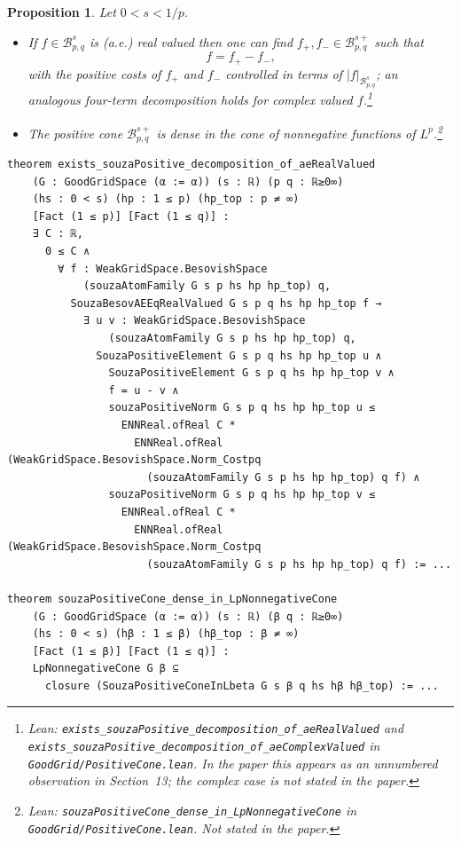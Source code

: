 \documentclass[11pt]{amsart}
\newtheorem{proposition}[theorem]{Proposition}
\theoremstyle{definition}
\newcommand{\lean}[1]{\texttt{#1}}
\begin{document}
\begin{proposition}\label{posdec}
Let $0 < s < 1/p$.
\begin{itemize}
\item[A.] If $f\in \mathcal{B}^s_{p,q}$ is (a.e.) real valued then one can
find $f_+,f_-\in \mathcal{B}^{s+}_{p,q}$ such that
$$f=f_+-f_-,$$
with the positive costs of $f_+$ and $f_-$ controlled in terms of
$|f|_{\mathcal{B}^{s}_{p,q}}$; an analogous four-term decomposition holds
for complex valued $f$.\footnote{Lean: \lean{exists\_souzaPositive\_decomposition\_of\_aeRealValued}
and \lean{exists\_souzaPositive\_decomposition\_of\_aeComplexValued} in
\lean{GoodGrid/PositiveCone.lean}. In the paper this appears as an unnumbered
observation in Section~13; the complex case is not stated in the paper.}
\item[B.] The positive cone $\mathcal{B}^{s+}_{p,q}$ is dense in the cone of
nonnegative functions of $L^p$.\footnote{Lean:
\lean{souzaPositiveCone\_dense\_in\_LpNonnegativeCone} in
\lean{GoodGrid/PositiveCone.lean}. Not stated in the paper.}
\end{itemize}
\end{proposition}
\begin{lstlisting}[style=lean,basicstyle=\ttfamily\scriptsize]
theorem exists_souzaPositive_decomposition_of_aeRealValued
    (G : GoodGridSpace (α := α)) (s : ℝ) (p q : ℝ≥0∞)
    (hs : 0 < s) (hp : 1 ≤ p) (hp_top : p ≠ ∞)
    [Fact (1 ≤ p)] [Fact (1 ≤ q)] :
    ∃ C : ℝ,
      0 ≤ C ∧
        ∀ f : WeakGridSpace.BesovishSpace
            (souzaAtomFamily G s p hs hp hp_top) q,
          SouzaBesovAEEqRealValued G s p q hs hp hp_top f →
            ∃ u v : WeakGridSpace.BesovishSpace
                (souzaAtomFamily G s p hs hp hp_top) q,
              SouzaPositiveElement G s p q hs hp hp_top u ∧
                SouzaPositiveElement G s p q hs hp hp_top v ∧
                f = u - v ∧
                souzaPositiveNorm G s p q hs hp hp_top u ≤
                  ENNReal.ofReal C *
                    ENNReal.ofReal (WeakGridSpace.BesovishSpace.Norm_Costpq
                      (souzaAtomFamily G s p hs hp hp_top) q f) ∧
                souzaPositiveNorm G s p q hs hp hp_top v ≤
                  ENNReal.ofReal C *
                    ENNReal.ofReal (WeakGridSpace.BesovishSpace.Norm_Costpq
                      (souzaAtomFamily G s p hs hp hp_top) q f) := ...

theorem souzaPositiveCone_dense_in_LpNonnegativeCone
    (G : GoodGridSpace (α := α)) (s : ℝ) (β q : ℝ≥0∞)
    (hs : 0 < s) (hβ : 1 ≤ β) (hβ_top : β ≠ ∞)
    [Fact (1 ≤ β)] [Fact (1 ≤ q)] :
    LpNonnegativeCone G β ⊆
      closure (SouzaPositiveConeInLbeta G s β q hs hβ hβ_top) := ...
\end{lstlisting}
\end{document}
